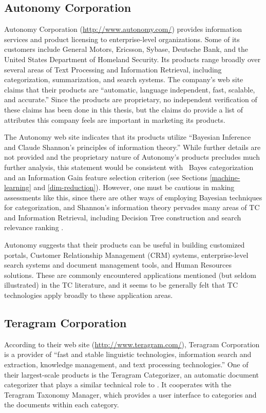 \subsection{Autonomy Corporation}

Autonomy Corporation (\url{http://www.autonomy.com/}) provides
information services and product licensing to enterprise-level
organizations.  Some of its customers include General Motors,
Ericsson, Sybase, Deutsche Bank, and the United States Department of
Homeland Security.  Its products range broadly over several areas of
Text Processing and Information Retrieval, including categorization,
summarization, and search systems.  The company's web site claims that
their products are ``automatic, language independent, fast, scalable,
and accurate.''  Since the products are proprietary, no independent
verification of these claims has been done in this thesis, but the
claims do provide a list of attributes this company feels are
important in marketing its products.

The Autonomy web site indicates that its products utilize ``Bayesian
Inference and Claude Shannon's principles of information theory.''
While further details are not provided and the proprietary nature of
Autonomy's products precludes much further analysis, this statement
would be
consistent with \naive\ Bayes categorization and an Information Gain
feature selection criterion (see Sections \ref{machine-learning} and
\ref{dim-reduction}).  However, one must be cautious in making
assessments like this, since there are other ways of employing
Bayesian techniques for categorization, and Shannon's
information theory pervades many areas of TC and Information
Retrieval, including Decision Tree construction
\cite{quinlan:89,wallace:93} and search relevance ranking
\cite{greiff:00}.

Autonomy suggests that their products can be useful in building
customized portals, Customer Relationship Management (CRM) systems,
enterprise-level search systems and document management tools, and
Human Resources solutions.  These are commonly encountered
applications mentioned (but seldom illustrated) in the TC literature,
and it seems to be generally felt that TC technologies apply broadly
to these application areas.

\subsection{Teragram Corporation}

According to their web site (\url{http://www.teragram.com/}), Teragram
Corporation is a provider of ``fast and stable linguistic
technologies, information search and extraction, knowledge management,
and text processing technologies.''  One of their largest-scale
products is the Teragram Categorizer, an automatic document
categorizer that plays a similar technical role to \aicat.
It cooperates with the Teragram Taxonomy Manager, which provides a
user interface to categories and the documents within each category.

